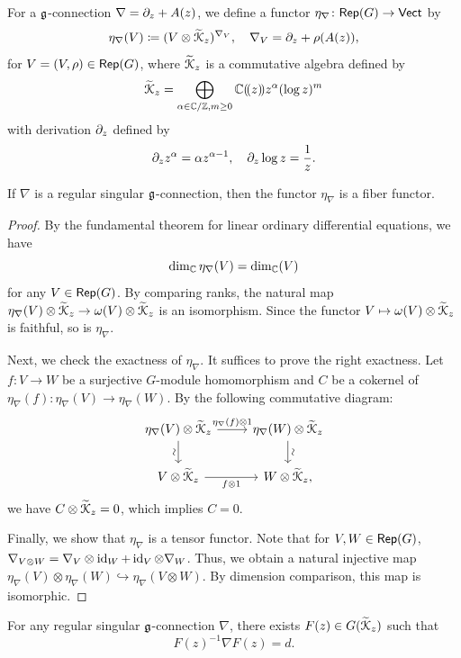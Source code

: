 \documentclass[final,reqno]{amsart}
\begin{document}
For a $\mathfrak{g}$-connection $\nabla=\partial_z+A(z)$, we define a functor $\eta_\nabla\colon\mathsf{Rep}(G)\to\mathsf{Vect}$ by
\[
    \eta_\nabla(V)\coloneqq(V\otimes\widetilde{\EuScript{K}}_z)^{\nabla_V},\quad \nabla_V=\partial_z+\rho(A(z)),
\]
for $V=(V,\rho)\in\mathsf{Rep}(G)$, where $\widetilde{\EuScript{K}}_z$ is a commutative algebra defined by
\[
    \widetilde{\EuScript{K}}_z=\bigoplus_{\alpha\in\mathbb{C}/\mathbb{Z},m\geq 0}\mathbb{C}(\!( z )\!)z^\alpha(\log z)^m
\]
with derivation $\partial_z$ defined by 
\[
    \partial_zz^\alpha=\alpha z^{\alpha-1},\quad \partial_z\log z=\frac{1}{z}.
\]
\begin{lem}\label{lem:fiber functor}
    If $\nabla$ is a regular singular $\mathfrak{g}$-connection, then the functor $\eta_\nabla$ is a fiber functor. 
\end{lem}

\begin{proof}
    By the fundamental theorem for linear ordinary differential equations, we have
    \[
        \dim_{\mathbb{C}}\eta_\nabla(V)=\dim_{\mathbb{C}}(V)
    \]
    for any $V\in\mathsf{Rep}(G)$. By comparing ranks, the natural map $\eta_\nabla(V)\otimes\widetilde{\EuScript{K}}_z\to \omega(V)\otimes\widetilde{\EuScript{K}}_z$ is an isomorphism. Since the functor $V\mapsto \omega(V)\otimes\widetilde{\EuScript{K}}_z$ is faithful, so is $\eta_\nabla$. 

    Next, we check the exactness of $\eta_\nabla$. It suffices to prove the right exactness. Let $f\colon V\to W$ be a surjective $G$-module homomorphism and $C$ be a cokernel of $\eta_\nabla(f)\colon \eta_\nabla(V)\to\eta_\nabla(W)$. By the following commutative diagram:
    \[
        \begin{tikzcd}
            \eta_\nabla(V)\otimes\wt{\shK}_z \ar[r,"\eta_\nabla(f)\otimes 1"]\ar[d,"\sim"' sloped] &\eta_\nabla(W)\otimes \wt{\shK}_z \ar[d,"\sim" sloped] \\
            V\otimes\wt{\shK}_z \ar[r,"f\otimes 1"'] &W\otimes\wt{\shK}_z, 
        \end{tikzcd}
    \]
    we have $C\otimes\widetilde{\EuScript{K}}_z=0$, which implies $C=0$.

    Finally, we show that $\eta_\nabla$ is a tensor functor. Note that for $V,W\in\mathsf{Rep}(G)$, $\nabla_{V\otimes W}=\nabla_V\otimes\operatorname{id}_W+\operatorname{id}_V\otimes\nabla_W$. Thus, we obtain a natural injective map $\eta_\nabla(V)\otimes\eta_\nabla(W)\hookrightarrow\eta_\nabla(V\otimes W)$. By dimension comparison, this map is isomorphic.
\end{proof}

\begin{thm}\label{thm:existence of G-valued solutions}
    For any regular singular $\mathfrak{g}$-connection $\nabla$, there exists $F(z)\in G(\widetilde{\EuScript{K}}_z)$ such that
    \[
        F(z)^{-1}\nabla F(z)=d.
    \]
\end{thm}
\end{document}
